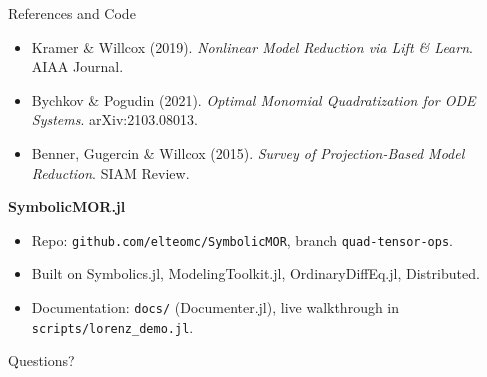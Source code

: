\documentclass[aspectratio=169,10pt]{beamer}
\begin{document}
\begin{frame}{References and Code}
  \footnotesize
  \begin{itemize}
    \item Kramer \& Willcox (2019). \emph{Nonlinear Model Reduction via Lift \& Learn}. AIAA Journal.
    \item Bychkov \& Pogudin (2021). \emph{Optimal Monomial Quadratization for ODE Systems}. arXiv:2103.08013.
    \item Benner, Gugercin \& Willcox (2015). \emph{Survey of Projection-Based Model Reduction}. SIAM Review.
  \end{itemize}

  \medskip
  \textbf{SymbolicMOR.jl}
  \begin{itemize}
    \item Repo: \texttt{github.com/elteomc/SymbolicMOR}, branch \texttt{quad-tensor-ops}.
    \item Built on Symbolics.jl, ModelingToolkit.jl, OrdinaryDiffEq.jl, Distributed.
    \item Documentation: \texttt{docs/} (Documenter.jl), live walkthrough in \texttt{scripts/lorenz\_demo.jl}.
  \end{itemize}

  \vspace{0.3cm}
  \begin{center}
    \large Questions?
  \end{center}
\end{frame}


\appendix
\end{document}
